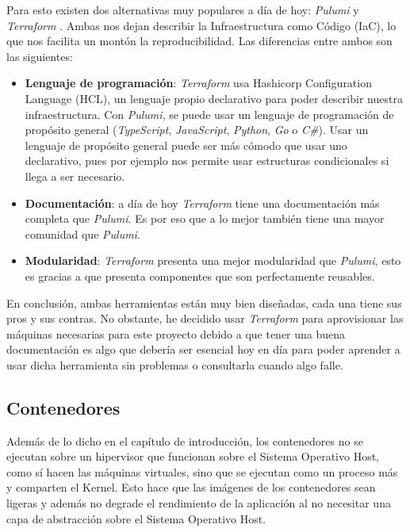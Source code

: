 Para esto existen dos alternativas muy populares a día de hoy: \textit{Pulumi} \cite{pulumi} y \textit{Terraform} \cite{Terraform}. Ambas nos dejan describir la Infraestructura como Código (IaC), lo que nos facilita un montón la reproducibilidad. Las diferencias entre ambos son las siguientes:

\begin{itemize}
	\item \textbf{Lenguaje de programación}: \textit{Terraform} usa Hashicorp Configuration Language (HCL), un lenguaje propio declarativo para poder describir nuestra infraestructura. Con \textit{Pulumi}, se puede usar un lenguaje de programación de propósito general (\textit{TypeScript}, \textit{JavaScript}, \textit{Python}, \textit{Go} o \textit{C\#}). Usar un lenguaje de propósito general puede ser más cómodo que usar uno declarativo, pues por ejemplo nos permite usar estructuras condicionales si llega a ser necesario.
	\item \textbf{Documentación}: a día de hoy \textit{Terraform} tiene una documentación más completa que \textit{Pulumi}. Es por eso que a lo mejor también tiene una mayor comunidad que \textit{Pulumi}.
	\item \textbf{Modularidad}: \textit{Terraform} presenta una mejor modularidad que \textit{Pulumi}, esto es gracias a que presenta componentes que son perfectamente reusables.
\end{itemize}

En conclusión, ambas herramientas están muy bien diseñadas, cada una tiene sus pros y sus contras. No obstante, he decidido usar \textit{Terraform} para aprovisionar las máquinas necesarias para este proyecto debido a que tener una buena documentación es algo que debería ser esencial hoy en día para poder aprender a usar dicha herramienta sin problemas o consultarla cuando algo falle.

\subsection{Contenedores}

Además de lo dicho en el capítulo de introducción, los contenedores no se ejecutan sobre un hipervisor que funcionan sobre el Sistema Operativo Host, como sí hacen las máquinas virtuales, sino que se ejecutan como un proceso más y comparten el Kernel. Esto hace que las imágenes de los contenedores sean ligeras y además no degrade el rendimiento de la aplicación al no necesitar una capa de abstracción sobre el Sistema Operativo Host.\newline

